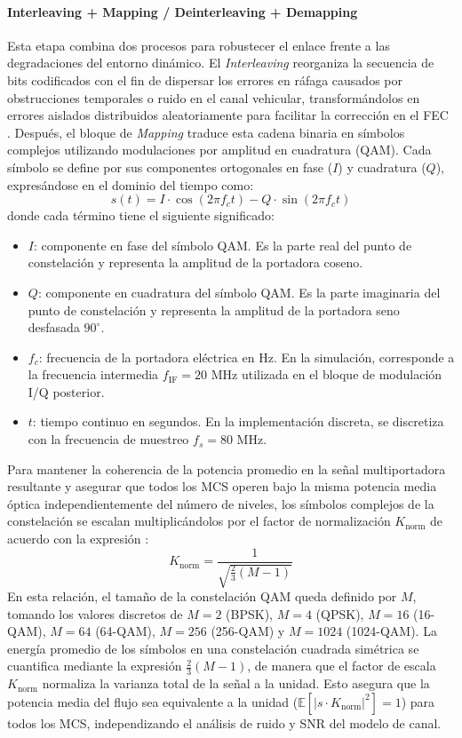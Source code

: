 \paragraph{Interleaving + Mapping / Deinterleaving + Demapping}
Esta etapa combina dos procesos para robustecer el enlace frente a las degradaciones del entorno dinámico. El \textit{Interleaving} reorganiza la secuencia de bits codificados con el fin de dispersar los errores en ráfaga causados por obstrucciones temporales o ruido en el canal vehicular, transformándolos en errores aislados distribuidos aleatoriamente para facilitar la corrección en el FEC \cite{kim2022ieee}. Después, el bloque de \textit{Mapping} traduce esta cadena binaria en símbolos complejos utilizando modulaciones por amplitud en cuadratura (QAM). Cada símbolo se define por sus componentes ortogonales en fase ($I$) y cuadratura ($Q$), expresándose en el dominio del tiempo \cite{ghassemlooy2019optical} como:
\begin{equation}
	s(t) = I \cdot \cos(2 \pi f_c t) - Q \cdot \sin(2 \pi f_c t)
	\label{eq:s_qam}
\end{equation}
donde cada término tiene el siguiente significado:
\begin{itemize}
\item $I$: componente en fase del símbolo QAM. Es la parte real del punto de constelación y representa la amplitud de la portadora coseno.
\item $Q$: componente en cuadratura del símbolo QAM. Es la parte imaginaria del punto de constelación y representa la amplitud de la portadora seno desfasada $90^\circ$.
\item $f_c$: frecuencia de la portadora eléctrica en Hz. En la simulación, corresponde a la frecuencia intermedia $f_{\text{IF}} = 20\text{ MHz}$ utilizada en el bloque de modulación I/Q posterior.
\item $t$: tiempo continuo en segundos. En la implementación discreta, se discretiza con la frecuencia de muestreo $f_s = 80\text{ MHz}$.
\end{itemize}
Para mantener la coherencia de la potencia promedio en la señal multiportadora resultante y asegurar que todos los MCS operen bajo la misma potencia media óptica independientemente del número de niveles, los símbolos complejos de la constelación se escalan multiplicándolos por el factor de normalización $K_{\text{norm}}$ de acuerdo con la expresión \cite{islim2017modulation}:
\begin{equation}
K_{\text{norm}} = \frac{1}{\sqrt{\frac{2}{3}(M-1)}}
\label{eq:k_norm}
\end{equation}
En esta relación, el tamaño de la constelación QAM queda definido por $M$, tomando los valores discretos de $M=2$ (BPSK), $M=4$ (QPSK), $M=16$ (16-QAM), $M=64$ (64-QAM), $M=256$ (256-QAM) y $M=1024$ (1024-QAM). La energía promedio de los símbolos en una constelación cuadrada simétrica se cuantifica mediante la expresión $\frac{2}{3}(M-1)$, de manera que el factor de escala $K_{\text{norm}}$ normaliza la varianza total de la señal a la unidad. Esto asegura que la potencia media del flujo sea equivalente a la unidad ($\mathbb{E}[|s \cdot K_{\text{norm}}|^2] = 1$) para todos los MCS, independizando el análisis de ruido y SNR del modelo de canal.

